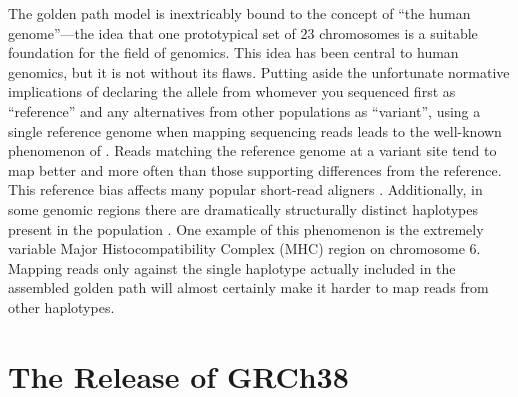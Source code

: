 \documentclass[11pt,proposal]{ucthesis}
\begin{document}
The golden path model is inextricably bound to the concept of ``the human genome''---the idea that one prototypical set of 23 chromosomes is a suitable foundation for the field of genomics. This idea has been central to human genomics, but it is not without its flaws. Putting aside the unfortunate normative implications of declaring the allele from whomever you sequenced first as ``reference'' and any alternatives from other populations as ``variant'', using a single reference genome when mapping sequencing reads leads to the well-known phenomenon of . Reads matching the reference genome at a variant site tend to map better and more often than those supporting differences from the reference. This reference bias affects many popular short-read aligners \cite{lunter2011stampy}. Additionally, in some genomic regions there are dramatically structurally distinct haplotypes present in the population \cite{church2011modernizing}. One example of this phenomenon is the extremely variable Major Histocompatibility Complex (MHC) region on chromosome 6. Mapping reads only against the single haplotype actually included in the assembled golden path will almost certainly make it harder to map reads from other haplotypes.


     
     
     
        
     
     
        

\section{The Release of GRCh38}
\end{document}
